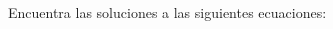 Encuentra las soluciones a las siguientes ecuaciones:

\begin{multicols}{2}
    \begin{parts}
        
        
        
        
        
        
    \end{parts}
\end{multicols}
